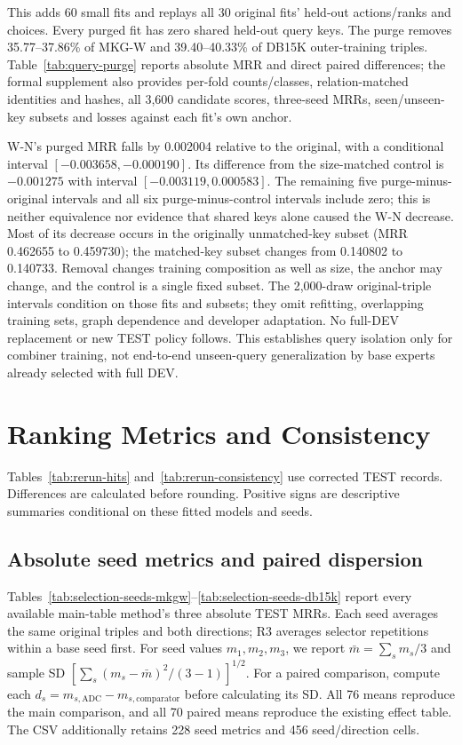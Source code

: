 \documentclass[11pt,a4paper]{article}
\begin{document}
This adds 60 small fits and replays all 30 original fits' held-out actions/ranks and choices. Every purged fit has zero shared held-out query keys. The purge removes 35.77--37.86\% of MKG-W and 39.40--40.33\% of DB15K outer-training triples. Table~\ref{tab:query-purge} reports absolute MRR and direct paired differences; the formal supplement also provides per-fold counts/classes, relation-matched identities and hashes, all 3,600 candidate scores, three-seed MRRs, seen/unseen-key subsets and losses against each fit's own anchor.


W-N's purged MRR falls by 0.002004 relative to the original, with a conditional interval $[-0.003658,-0.000190]$. Its difference from the size-matched control is $-0.001275$ with interval $[-0.003119,0.000583]$. The remaining five purge-minus-original intervals and all six purge-minus-control intervals include zero; this is neither equivalence nor evidence that shared keys alone caused the W-N decrease. Most of its decrease occurs in the originally unmatched-key subset (MRR 0.462655 to 0.459730); the matched-key subset changes from 0.140802 to 0.140733. Removal changes training composition as well as size, the anchor may change, and the control is a single fixed subset. The 2,000-draw original-triple intervals condition on those fits and subsets; they omit refitting, overlapping training sets, graph dependence and developer adaptation. No full-DEV replacement or new TEST policy follows. This establishes query isolation only for combiner training, not end-to-end unseen-query generalization by base experts already selected with full DEV.
\FloatBarrier

\section{Ranking Metrics and Consistency}
\label{app:ranking}
Tables~\ref{tab:rerun-hits} and~\ref{tab:rerun-consistency} use corrected TEST records. Differences are calculated before rounding. Positive signs are descriptive summaries conditional on these fitted models and seeds.


\subsection{Absolute seed metrics and paired dispersion}
\label{app:seed-dispersion}
Tables~\ref{tab:selection-seeds-mkgw}--\ref{tab:selection-seeds-db15k} report every available main-table method's three absolute TEST MRRs. Each seed averages the same original triples and both directions; R3 averages selector repetitions within a base seed first. For seed values $m_1,m_2,m_3$, we report $\bar m=\sum_s m_s/3$ and sample SD $[\sum_s(m_s-\bar m)^2/(3-1)]^{1/2}$. For a paired comparison, compute each $d_s=m_{s,\mathrm{ADC}}-m_{s,\mathrm{comparator}}$ before calculating its SD. All 76 means reproduce the main comparison, and all 70 paired means reproduce the existing effect table. The CSV additionally retains 228 seed metrics and 456 seed/direction cells.
\end{document}
